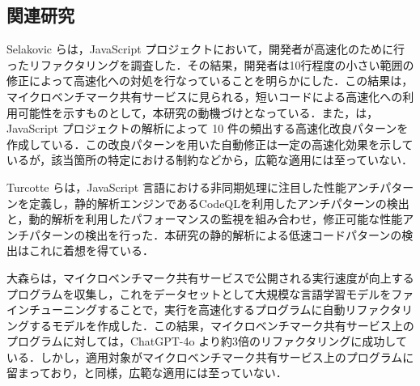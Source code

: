 \documentclass[submit,techrep,noauthor]{ipsj}
\newcommand{\todo}[1]{\colorbox{yellow}{{\bf TODO}:}{\color{red} {\textbf{[#1]}}}}
\begin{document}



\subsection{関連研究}

Selakovic ら\cite{jsRefac}は，JavaScript プロジェクトにおいて，開発者が高速化のために行ったリファクタリングを調査した．その結果，開発者は10行程度の小さい範囲の修正によって高速化への対処を行なっていることを明らかにした．この結果は，マイクロベンチマーク共有サービスに見られる，短いコードによる高速化への利用可能性を示すものとして，本研究の動機づけとなっている．また，\cite{jsRefac}は，JavaScript プロジェクトの解析によって 10 件の頻出する高速化改良パターンを作成している．この改良パターンを用いた自動修正は一定の高速化効果を示しているが，該当箇所の特定における制約などから，広範な適用には至っていない．

Turcotte ら\cite{DrAsync}は，JavaScript 言語における非同期処理に注目した性能アンチパターンを定義し，静的解析エンジンであるCodeQL\cite{ql}を利用したアンチパターンの検出と，動的解析を利用したパフォーマンスの監視を組み合わせ，修正可能な性能アンチパターンの検出を行った．本研究の静的解析による低速コードパターンの検出はこれに着想を得ている．

大森ら\cite{omori}は，マイクロベンチマーク共有サービスで公開される実行速度が向上するプログラムを収集し，これをデータセットとして大規模な言語学習モデルをファインチューニングすることで，実行を高速化するプログラムに自動リファクタリングするモデルを作成した．この結果，マイクロベンチマーク共有サービス上のプログラムに対しては，ChatGPT-4o より約3倍のリファクタリングに成功している．しかし，適用対象がマイクロベンチマーク共有サービス上のプログラムに留まっており，\cite{jsRefac}と同様，広範な適用には至っていない．
\end{document}
